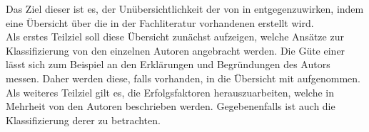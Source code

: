Das Ziel dieser \BA ist es, der Unübersichtlichkeit der \KAS von \EF in 
\ISPS entgegenzuwirken, indem eine Übersicht über die in der Fachliteratur vorhandenen \KAS erstellt wird.\\
Als erstes Teilziel soll diese Übersicht zunächst aufzeigen, welche Ansätze zur Klassifizierung von den einzelnen Autoren angebracht werden.
Die Güte einer \KA lässt sich zum Beispiel an den Erklärungen und Begründungen des Autors messen. Daher werden diese, falls vorhanden, in die
Übersicht mit aufgenommen.
Als weiteres Teilziel gilt es, die Erfolgsfaktoren herauszuarbeiten, welche in Mehrheit von den Autoren beschrieben werden. Gegebenenfalls ist auch die Klassifizierung derer zu betrachten.
